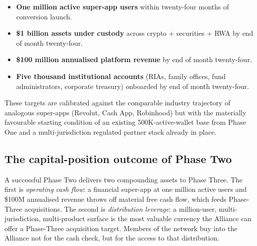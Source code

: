 \begin{itemize}[leftmargin=2em,itemsep=0.1em]
\item \textbf{One million active super-app users} within twenty-four
months of conversion launch.
\item \textbf{\$1 billion assets under custody} across crypto +
securities + RWA by end of month twenty-four.
\item \textbf{\$100 million annualised platform revenue} by end of
month twenty-four.
\item \textbf{Five thousand institutional accounts} (RIAs, family
offices, fund administrators, corporate treasury) onboarded by end of
month twenty-four.
\end{itemize}

These targets are calibrated against the comparable industry trajectory
of analogous super-apps (Revolut, Cash App, Robinhood) but with the
materially favourable starting condition of an existing 500K-active-wallet
base from Phase One and a multi-jurisdiction regulated partner stack
already in place.

\subsection{The capital-position outcome of Phase Two}

A successful Phase Two delivers two compounding assets to Phase Three.
The first is \emph{operating cash flow}: a financial super-app at one
million active users and \$100M annualised revenue throws off material
free cash flow, which feeds Phase-Three acquisitions. The second is
\emph{distribution leverage}: a million-user, multi-jurisdiction,
multi-product surface is the most valuable currency the Alliance can
offer a Phase-Three acquisition target. Members of the network buy
into the Alliance not for the cash check, but for the access to that
distribution.
